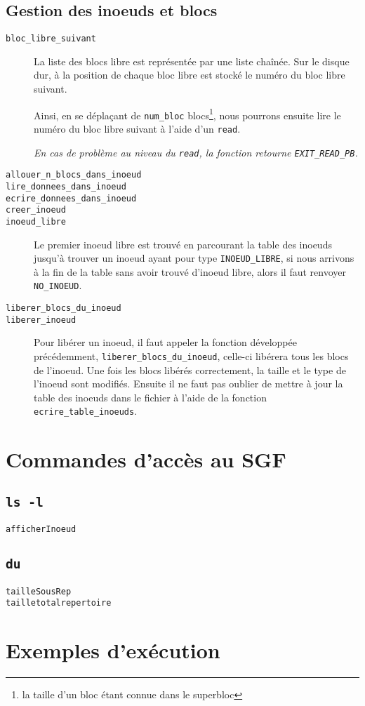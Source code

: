\documentclass[a4paper, 11pt]{article}
\begin{document}
		\subsection{Gestion des inoeuds et blocs}
		\begin{description}
			\item[\texttt{bloc\_libre\_suivant}] La liste des blocs libre est représentée par une liste chaînée. Sur le disque dur, à la position de chaque bloc
				libre est stocké le numéro du bloc libre suivant.

				Ainsi, en se déplaçant de \texttt{num\_bloc} blocs\footnote{la taille d'un bloc étant connue dans le superbloc}, 
				nous pourrons ensuite lire le numéro du bloc libre suivant à l'aide d'un \texttt{read}. 
				
				\textit{En cas de problème au niveau du \texttt{read}, la fonction retourne \texttt{EXIT\_READ\_PB}.}
			\item[\texttt{allouer\_n\_blocs\_dans\_inoeud}]
			\item[\texttt{lire\_donnees\_dans\_inoeud}]
			\item[\texttt{ecrire\_donnees\_dans\_inoeud}]
			\item[\texttt{creer\_inoeud}]
			\item[\texttt{inoeud\_libre}] Le premier inoeud libre est trouvé en parcourant la table des inoeuds jusqu'à trouver un inoeud ayant pour type
				\texttt{INOEUD\_LIBRE}, si nous arrivons à la fin de la table sans avoir trouvé d'inoeud libre, alors il faut renvoyer \texttt{NO\_INOEUD}. 
			\item[\texttt{liberer\_blocs\_du\_inoeud}]
			\item[\texttt{liberer\_inoeud}] Pour libérer un inoeud, il faut appeler la fonction développée précédemment, \texttt{liberer\_blocs\_du\_inoeud},
				celle-ci libérera tous les blocs de l'inoeud. Une fois les blocs libérés correctement, la taille et le type de l'inoeud sont modifiés. Ensuite il
				ne faut pas oublier de mettre à jour la table des inoeuds dans le fichier à l'aide de la fonction \texttt{ecrire\_table\_inoeuds}.
		\end{description}
	\section{Commandes d'accès au SGF}
	\subsection{\texttt{ls -l}}
	\begin{description}
		\item[\texttt{afficherInoeud}] 
	\end{description}
	\subsection{\texttt{du}}
	\begin{description}
		\item[\texttt{tailleSousRep}] 
		\item[\texttt{tailletotalrepertoire}] 
	\end{description}
	\section{Exemples d'exécution}
\end{document}

